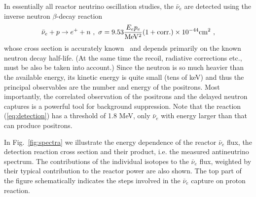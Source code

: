 \documentclass[aps,twocolumn,preprintnumbers,amsmath,superscriptaddress,amssymb,floats,nofootinbib]{revtex4-1}
\begin{document}
In essentially all reactor neutrino oscillation studies, the $\bar{\nu}_e$ are detected using the inverse neutron $\beta$-decay reaction
\begin{equation}
\bar{\nu}_e + p \rightarrow e^+ + n~, \\ ~ \sigma = 9.53 \frac{E_e p_e}{ {\rm MeV^2}} (1 + \textrm{corr.}) \times 10^{-44} {\rm cm^2} ~,
\label{eq:detection}
\end{equation}
whose cross section is accurately known~\cite{VB99, Strumia} and depends primarily on the known neutron decay half-life. (At the same time the recoil, radiative
corrections etc., must be also be taken into account.) Since the neutron is so much heavier than the available energy, its kinetic energy is quite
small (tens of keV) and thus the principal observables are the number and energy of the positrons. Most importantly, the correlated observation of the
positrons and the delayed neutron captures is a powerful tool for background suppression. Note that the reaction (\ref{eq:detection}) has
a threshold of 1.8 MeV, only $\bar{\nu}_e$ with energy larger than that can produce positrons. 

In Fig.~\ref{fig:spectra} we illustrate the energy dependence of the reactor $\bar{\nu}_e$ flux, the detection reaction cross section and their product,
i.e. the measured antineutrino spectrum. The contributions of the individual isotopes to the $\bar{\nu}_e$ flux, weighted by their typical contribution
to the reactor power are also shown. The top part of the figure schematically indicates the steps involved in the $\bar{\nu}_e$ capture on proton reaction. 


\onecolumngrid
\vspace{12pt}
\fboxsep=12pt
\end{document}
